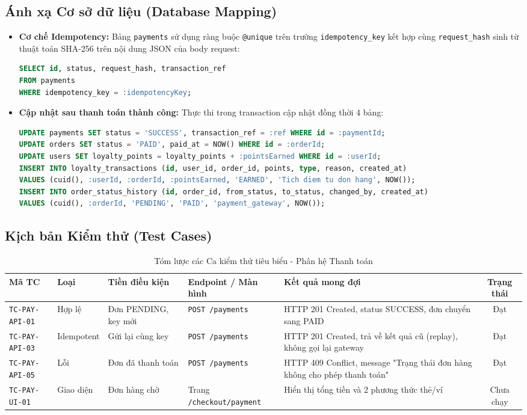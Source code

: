 \documentclass[12pt,a4paper,oneside]{report}
\begin{document}
\subsection{Ánh xạ Cơ sở dữ liệu (Database Mapping)}
\begin{itemize}
    \item \textbf{Cơ chế Idempotency:} Bảng \texttt{payments} sử dụng ràng buộc \texttt{@unique} trên trường \texttt{idempotency\_key} kết hợp cùng \texttt{request\_hash} sinh từ thuật toán SHA-256 trên nội dung JSON của body request:
    \begin{lstlisting}[language=SQL]
SELECT id, status, request_hash, transaction_ref 
FROM payments 
WHERE idempotency_key = :idempotencyKey;
    \end{lstlisting}
    \item \textbf{Cập nhật sau thanh toán thành công:} Thực thi trong transaction cập nhật đồng thời 4 bảng:
    \begin{lstlisting}[language=SQL]
UPDATE payments SET status = 'SUCCESS', transaction_ref = :ref WHERE id = :paymentId;
UPDATE orders SET status = 'PAID', paid_at = NOW() WHERE id = :orderId;
UPDATE users SET loyalty_points = loyalty_points + :pointsEarned WHERE id = :userId;
INSERT INTO loyalty_transactions (id, user_id, order_id, points, type, reason, created_at)
VALUES (cuid(), :userId, :orderId, :pointsEarned, 'EARNED', 'Tich diem tu don hang', NOW());
INSERT INTO order_status_history (id, order_id, from_status, to_status, changed_by, created_at)
VALUES (cuid(), :orderId, 'PENDING', 'PAID', 'payment_gateway', NOW());
    \end{lstlisting}
\end{itemize}

\subsection{Kịch bản Kiểm thử (Test Cases)}
\begin{table}[H]
\centering
\small
\caption{Tóm lược các Ca kiểm thử tiêu biểu - Phân hệ Thanh toán}
\label{tab:tc-payment}
\begin{tabularx}{\textwidth}{llp{2.6cm}p{3cm}Xc}
\toprule
\textbf{Mã TC} & \textbf{Loại} & \textbf{Tiền điều kiện} & \textbf{Endpoint / Màn hình} & \textbf{Kết quả mong đợi} & \textbf{Trạng thái} \\
\midrule
\texttt{TC-PAY-API-01} & Hợp lệ & Đơn PENDING, key mới & \texttt{POST /payments} & HTTP 201 Created, status SUCCESS, đơn chuyển sang PAID & Đạt \\
\texttt{TC-PAY-API-03} & Idempotent & Gửi lại cùng key & \texttt{POST /payments} & HTTP 201 Created, trả về kết quả cũ (replay), không gọi lại gateway & Đạt \\
\texttt{TC-PAY-API-05} & Lỗi & Đơn đã thanh toán & \texttt{POST /payments} & HTTP 409 Conflict, message "Trạng thái đơn hàng không cho phép thanh toán" & Đạt \\
\texttt{TC-PAY-UI-01} & Giao diện & Đơn hàng chờ & Trang \texttt{/checkout/payment} & Hiển thị tổng tiền và 2 phương thức thẻ/ví & Chưa chạy \\
\bottomrule
\end{tabularx}
\end{table}
\end{document}
